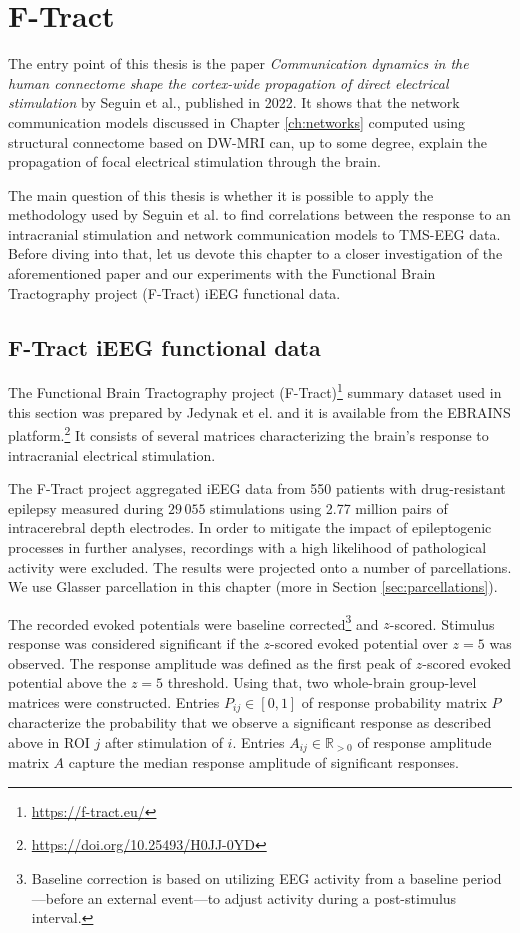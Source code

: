 \chapter{F-Tract}\label{ch:ftract}

The entry point of this thesis is the paper \textit{Communication dynamics in the human connectome shape the cortex-wide propagation of direct electrical stimulation} by Seguin et al., published in 2022. It shows that the network communication models discussed in Chapter \ref{ch:networks} computed using structural connectome based on DW-MRI can, up to some degree, explain the propagation of focal electrical stimulation through the brain. 

The main question of this thesis is whether it is possible to apply the methodology used by Seguin et al. to find correlations between the response to an intracranial stimulation and network communication models to TMS-EEG data. Before diving into that, let us devote this chapter to a closer investigation of the aforementioned paper and our experiments with the Functional Brain Tractography project (F-Tract) iEEG functional data.  

\section{F-Tract iEEG functional data}

The Functional Brain Tractography project (F-Tract)\footnote{\url{https://f-tract.eu/}} summary dataset used in this section was prepared by Jedynak et el. \cite{jedynak_f-tract_2023} and it is available from the EBRAINS platform.\footnote{\url{https://doi.org/10.25493/H0JJ-0YD}} It consists of several matrices characterizing the brain's response to intracranial electrical stimulation.

The F-Tract project aggregated iEEG data from 550 patients with drug-resistant epilepsy measured during $29\,055$ stimulations using 2.77 million pairs of intracerebral depth electrodes. In order to mitigate the impact of epileptogenic processes in further analyses, recordings with a high likelihood of pathological activity were excluded. The results were projected onto a number of parcellations. We use Glasser parcellation in this chapter (more in Section \ref{sec:parcellations}). \cite{jedynak_f-tract_2023,seguin_communication_2023} 

The recorded evoked potentials were baseline corrected\footnote{Baseline correction is based on utilizing EEG activity from a baseline period—before an external event—to adjust activity during a post-stimulus interval.} and $z$-scored. Stimulus response was considered significant if the $z$-scored evoked potential over $z = 5$ was observed. The response amplitude was defined as the first peak of $z$-scored evoked potential above the $z = 5$ threshold. Using that, two whole-brain group-level matrices were constructed. Entries $P_{ij} \in [0,1]$ of response probability matrix $P$ characterize the probability that we observe a significant response as described above in ROI $j$ after stimulation of $i$. Entries $A_{ij} \in \mathbb{R}_{>0}$ of response amplitude matrix $A$ capture the median response amplitude of significant responses.

